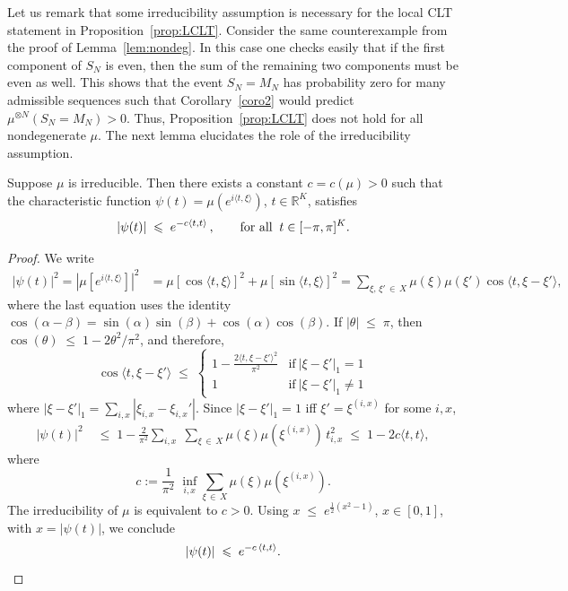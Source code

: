 \documentclass[AHL,Unicode,longabstracts,published]{cedram}
\renewcommand{\leq}{\;\leqslant\;}
\newcommand{\scalar}[2]{\langle #1, #2\rangle}
\newcommand{\bbR}{\mathbb{R}}
\begin{document}
Let us remark that some irreducibility assumption is necessary for the local CLT statement in Proposition~\ref{prop:LCLT}. Consider the same counterexample from the proof of Lemma~\ref{lem:nondeg}. In this case one checks easily that if the first component of $S_N$ is even, then the sum of the remaining two components must be even as well. This shows that the event $S_N=M_N$ has probability zero for many admissible sequences such that Corollary~\ref{coro2} would predict $\mu^{\otimes N}(S_N=M_N) >0$. Thus, Proposition~\ref{prop:LCLT} does not hold for all nondegenerate $\mu$. The next lemma elucidates the role of the irreducibility assumption.

\begin{lemm}\label{charfunc}
Suppose $\mu$ is irreducible. Then there exists a constant $c=c(\mu)>0$ such that the characteristic function $\psi(t)=\mu(e^{i\scalar{t}{\xi}})$, $t\in\bbR^K$, satisfies
\begin{align*}
|\psi(t)|\leq e^{-c
\scalar{t}{t} }\,,\qquad \text{for all\;\;} t\in[-\pi,\pi]^K.
\end{align*}
\end{lemm}


\begin{proof}
We write
\begin{align*}
|\psi(t)|^2 = \left|\mu\left[e^{i\scalar{t}{\xi}}\right]\right|^2 &=\mu\left[\cos\scalar{t}{\xi}\right]^2 + \mu\left[\sin\scalar{t}{\xi}\right]^2 =\sum_{\xi,\,\xi'\,\in\,X}\mu(\xi)\mu(\xi')\cos\scalar{t}{\xi-\xi'},
\end{align*}
where the last equation uses the identity $\cos(\alpha-\beta) = \sin(\alpha)\sin(\beta) + \cos(\alpha)\cos(\beta).$ If $|\theta|\leq \pi$, then $\cos(\theta)\leq 1-2\theta^2/\pi^2$, and therefore,
\begin{equation*}
\cos\scalar{t}{\xi-\xi'} \leq
\begin{cases}
1-\frac{2\scalar{t}{\xi-\xi'}^2}{\pi^2} & \text{if} \ |\xi-\xi'|_1 = 1 \\
1 & \text{if} \ |\xi-\xi'|_1 \neq 1
\end{cases}
\end{equation*}
where $|\xi-\xi'|_1=\sum_{i,x}|\xi_{i,x}-\xi_{i,x}'|$. Since $|\xi-\xi'|_1=1$ iff $\xi'=\xi^{(i,x)}$ for some $i,x$,
\begin{align*}
|\psi(t)|^2 &\leq 1-\frac{2}{\pi^2}\sum_{i,x}\;\sum_{\xi\,\in\,X}\mu(\xi)\mu\left(\xi^{(i,x)}\right)\,t_{i,x}^2
\leq 1-2c\scalar{t}{t},
\end{align*}
where
\[
c:=\frac1{\pi^2} \;\inf_{i,x}\sum_{\xi\,\in\,X}\mu(\xi)\mu\left(\xi^{(i,x)}\right)
.
\]
The irreducibility of $\mu$ is equivalent to $c>0$. Using $x\leq e^{\frac{1}{2}(x^2-1)}$, $x \in [0,1]$, with $x=|\psi(t)|$, we conclude
\begin{equation*}
|\psi(t)|\leq e^{-c\,\scalar{t}{t}}.
\qedhere
\end{equation*}
\end{proof}
\end{document}

